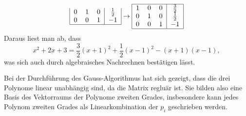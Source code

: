 \begin{loesung}
\begin{teilaufgaben}
\begin{align*}
\begin{tabular}{|ccc|c|}
0&1&0&$\frac12$\\
0&0&1&$-1$\\
\hline
\end{tabular}
\rightarrow
\begin{tabular}{|ccc|c|}
\hline
1&0&0&$\frac32$\\
0&1&0&$\frac12$\\
0&0&1&$-1$\\
\hline
\end{tabular}
\end{align*}
Daraus liest man ab, dass
\[
x^2+2x+3=\frac32(x+1)^2+\frac12(x-1)^2-(x+1)(x-1),
\]
was sich auch durch algebraisches Nachrechnen bestätigen lässt.
\item
Bei der Durchführung des Gauss-Algorithmus hat sich gezeigt, dass
die drei Polynome linear unabhängig sind, da die Matrix regluär
ist. Sie bilden also eine Basis des Vektorraums der Polynome zweiten
Grades, insbesondere kann jedes Polynom zweiten Grades als Linearkombination
der $p_i$ geschrieben werden.
\qedhere
\end{teilaufgaben}
\end{loesung}

